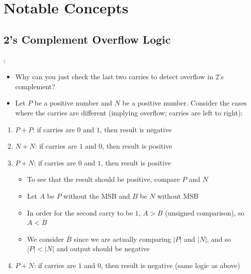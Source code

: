 \documentclass{../slides}
\begin{document}
\section{Notable Concepts}
\subsection{2's Complement Overflow Logic}
\begin{frame}{\secname: \subsecname}
    \begin{itemize}
        \item Why can you just check the last two carries to detect overflow in 2's complement?
        \item Let $P$ be a positive number and $N$ be a positive number. Consider the cases where the carries are different (implying overflow; carries are left to right):
    \end{itemize}
    \begin{enumerate}
        \item $P + P$: if carries are $0$ and $1$, then result is negative
        \item $N + N$: if carries are $1$ and $0$, then result is positive
        \item $P + N$: if carries are $0$ and $1$, then result is positive
        \begin{itemize}
            \item To see that the result should be positive, compare $P$ and $N$
            \item Let $A$ be $P$ without the MSB and $B$ be $N$ without MSB
            \item In order for the second carry to be $1$, $A > B$ (unsigned comparison), so $A < \overbar{B}$
            \item We consider $\overbar{B}$ since we are actually comparing $|P|$ and $|N|$, and so $|P| < |N|$ and output should be negative
        \end{itemize}
        \item $P + N$: if carries are $1$ and $0$, then result is negative (same logic as above)
    \end{enumerate}
\end{frame}
\end{document}
